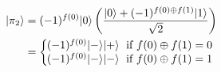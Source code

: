 \documentclass[preview]{standalone}
\begin{document}
\begin{align*}
|\pi_2\rangle &= (-1)^{f(0)}|0\rangle \left( \frac{|0\rangle + (-1)^{f(0)\oplus f(1)} |1\rangle}{\sqrt{2}}\right) \\ &=  \left\{ \begin{array}{ll} \hspace{-2mm} (-1)^{f(0)}  |-\rangle   |+\rangle  \; \text{ if } f(0) \oplus f(1) = 0 \\ \hspace{-2mm} (-1)^{f(0)}  |-\rangle   |-\rangle  \; \text{ if } f(0) \oplus f(1) = 1 \end{array} \right.
\end{align*}
\end{document}
